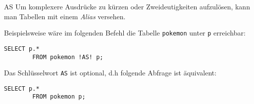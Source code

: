 \begin{sql}{AS}
    Um komplexere Ausdrücke zu kürzen oder Zweideutigkeiten aufzulösen, kann man Tabellen mit einem \emph{Alias} versehen.

    Beispielsweise wäre im folgenden Befehl die Tabelle \texttt{pokemon} unter \texttt{p} erreichbar:

    \begin{lstlisting}[language=mysql]
        SELECT p.*
        FROM pokemon !AS! p;
    \end{lstlisting}

    Das Schlüsselwort \texttt{AS} ist optional, d.h folgende Abfrage ist äquivalent:

    \begin{lstlisting}[language=mysql]
        SELECT p.*
        FROM pokemon p;
    \end{lstlisting}
\end{sql}

